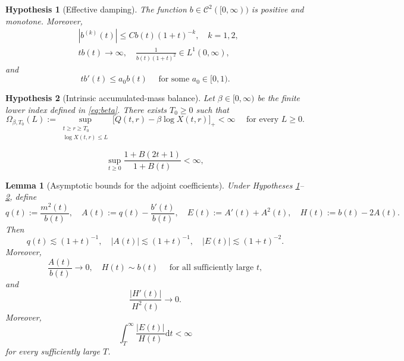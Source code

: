 \documentclass[10pt,a4paper]{amsart}
\newtheorem{hypothesis}{Hypothesis}
\newtheorem{lemma}{Lemma}
\begin{document}
	\begin{hypothesis}[Effective damping]
		\label{ass:b}
		The function $b\in \mathcal{C}^2([0,\infty))$ is positive and monotone. Moreover,
		\begin{align}
			\label{eq:b-der}
			&|b^{(k)}(t)|\leq Cb(t)(1+t)^{-k},
			\quad k=1,2, \\
			\label{eq:b-eff}
			&tb(t)\longrightarrow\infty,
			\quad
			\frac{1}{b(t)(1+t)^2}\in L^1(0,\infty),
		\end{align}
		and
		\begin{equation}
			\label{eq:b-growth}
			tb'(t)\leq a_0b(t)
			\quad \text{ for some } a_0\in[0,1).
		\end{equation}
	\end{hypothesis}

	\begin{hypothesis}[Intrinsic accumulated-mass balance]
		\label{ass:balance}
		Let $\beta\in[0,\infty)$ be the finite lower index defined in \eqref{eq:beta}. There exists $T_0\geq0$ such that
		$$
		\Omega_{\beta,T_0}(L):=
		\sup_{\substack{t\geq r\geq T_0\\
				\log X(t,r)\leq L}}
		\bigl[Q(t,r)-\beta\log X(t,r)\bigr]_+<\infty
		\quad \text{ for every } L\geq0.
		$$
	\end{hypothesis}

		\begin{equation}
			\label{eq:Bdoubling}
			\sup_{t\geq0}\frac{1+B(2t+1)}{1+B(t)}<\infty,
		\end{equation}

	\begin{lemma}[Asymptotic bounds for the adjoint coefficients]
		\label{lem:AEH}
		Under Hypotheses \ref{ass:b}--\ref{ass:balance}, define
		\begin{equation}
			\label{eq:AEH}
			q(t):=\frac{m^2(t)}{b(t)},
			\quad
			A(t):=q(t)-\frac{b'(t)}{b(t)},
			\quad
			E(t):=A'(t)+A^2(t),
			\quad
			H(t):=b(t)-2A(t).
		\end{equation}
		Then
		$$
		q(t)\lesssim(1+t)^{-1},
		\quad
		|A(t)|\lesssim(1+t)^{-1},
		\quad
		|E(t)|\lesssim(1+t)^{-2}.
		$$
		Moreover,
		$$
		\frac{A(t)}{b(t)}\longrightarrow0,
		\quad
		H(t)\sim b(t)
		\quad \text{ for all sufficiently large } t,
		$$
		and
		$$
		\frac{|H'(t)|}{H^2(t)}\longrightarrow0.
		$$
		Moreover,
		\begin{equation}
			\label{eq:E-tail}
			\int_T^\infty\frac{|E(t)|}{H(t)}\mathrm{d}t<\infty
		\end{equation}
		for every sufficiently large $T$.
	\end{lemma}
\end{document}
